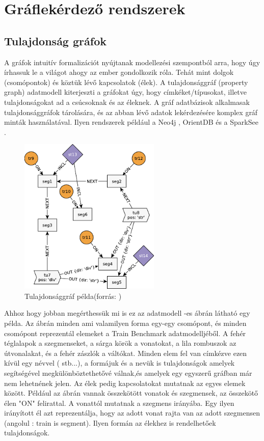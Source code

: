 \section{Gráflekérdező rendszerek}
\subsection{Tulajdonság gráfok}

A gráfok intuitív formalizációt nyújtanak modellezési szempontból arra, hogy úgy írhassuk le a világot ahogy az ember gondolkozik róla. Tehát mint dolgok (csomópontok) és köztük lévő kapcsolatok (élek)\cite{marton2017model}. A tulajdonsággráf (property graph) adatmodell kiterjeszti a gráfokat úgy, hogy címkéket/típusokat, illetve tulajdonságokat ad a csúcsoknak és az éleknek. A gráf adatbázisok  alkalmasak tulajdonsággráfok tárolására, és az abban lévő adatok lekérdezésére komplex gráf minták használatával. Ilyen rendszerek például a Neo4j \cite{neo4j}, OrientDB \cite{orientdb} és a  SparkSee \cite{sparksee}.

\begin{figure}
	\centering
	\includegraphics[width=0.6\textwidth]{figures/tulajdonsággráfpélda}
	\caption{Tulajdonsággráf példa(forrás: \cite{marton2017model})}
	\label{fig:tulajdonsággráfpélda}
\end{figure}

Ahhoz hogy jobban megérthessük mi is ez az adatmodell  -es ábrán látható egy példa. Az ábrán minden ami valamilyen forma egy-egy csomópont, és minden csomópont reprezentál elemeket a Train Benchmark adatmodelljéből. A fehér téglalapok a szegmenseket,  a sárga körök a vonatokat, a lila rombuszok az útvonalakat, és a fehér zászlók a váltókat. Minden elem fel van címkézve ezen kívül egy névvel ( stb...), a formájuk és a nevük is tulajdonságok amelyek segítségével megkülönböztethetővé válnak,és amelyek egy egyszerű gráfban már nem lehetnének jelen. Az élek pedig kapcsolatokat mutatnak az egyes elemek között. Például az ábrán vannak összekötött vonatok és szegmensek, az összekötő élen "ON" felirattal. A vonattól mutatnak a szegmens irányába. Egy ilyen irányított él azt reprezentálja, hogy az adott vonat rajta van az adott szegmensen (angolul : train is  segment). Ilyen formán az élekhez is rendelhetőek tulajdonságok. 


